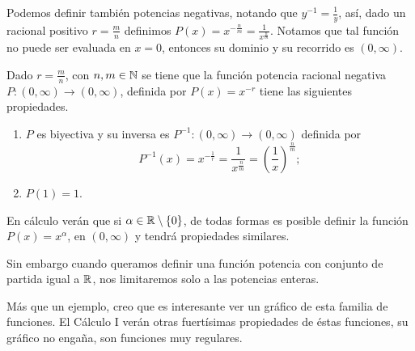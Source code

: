 Podemos definir también potencias negativas, notando que $y^{-1}=\frac{1}{y}$, así, dado un racional positivo $r=\frac{m}{n}$ definimos $P(x)=x^{-\frac{n}{m}}=\frac{1}{x^{\frac{n}{m}}}$.
Notamos que tal función no puede ser evaluada en $x=0$, entonces su dominio y su recorrido es $(0,\infty)$.

\vspace{.2cm}


\begin{prop}
Dado $r=\frac{m}{n}$, con $n,m\in \mathbb{N}$ se tiene que la función potencia racional negativa $P:(0,\infty)\rightarrow(0,\infty)$, definida por $P(x)=x^{-r}$ tiene las siguientes propiedades.

\begin{enumerate}
\item $P$ es biyectiva y su inversa es $P^{-1}:(0,\infty)\rightarrow(0,\infty)$ definida por $$P^{-1}(x)=x^{-\frac{1}{r}}=\frac{1}{x^{\frac{n}{m}}}=\left(\frac{1}{x}\right)^{\frac{n}{m}};$$
\item $P(1)=1$.
\end{enumerate}
\end{prop}


En cálculo verán que si $\alpha \in\mathbb{R}\setminus\{0\}$, de todas formas es posible definir la función $P(x)=x^{\alpha}$, en $(0,\infty)$ y tendrá propiedades similares.

Sin embargo cuando queramos definir una función potencia con conjunto de partida igual a $\mathbb{R}$, nos limitaremos solo a las potencias enteras.

\vspace{.2cm}


\begin{ejemplo}
Más que un ejemplo, creo que es interesante ver un gráfico de esta familia de funciones.
El Cálculo I verán otras fuertísimas propiedades de éstas funciones, su gráfico no engaña, son funciones muy regulares.
\begin{center}
\end{center}
\end{ejemplo}

